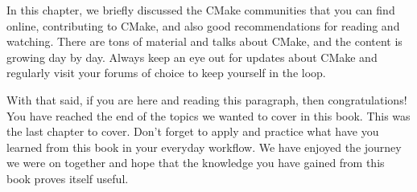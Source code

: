In this chapter, we briefly discussed the CMake communities that you can find online, contributing to CMake, and also good recommendations for reading and watching. There are tons of material and talks about CMake, and the content is growing day by day. Always keep an eye out for updates about CMake and regularly visit your forums of choice to keep yourself in the loop.

With that said, if you are here and reading this paragraph, then congratulations! You have reached the end of the topics we wanted to cover in this book. This was the last chapter to cover. Don't forget to apply and practice what have you learned from this book in your everyday workflow. We have enjoyed the journey we were on together and hope that the knowledge you have gained from this book proves itself useful.